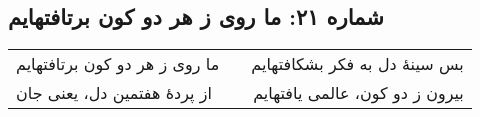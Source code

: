 \begin{center}
\section*{شماره ۲۱: ما روی ز هر دو کون برتافتهایم}
\label{sec:021}
\begin{longtable}{l p{0.5cm} r}
ما روی ز هر دو کون برتافتهایم
&&
بس سینهٔ دل به فکر بشکافتهایم
\\
از پردهٔ هفتمین دل، یعنی جان
&&
بیرون ز دو کون، عالمی یافتهایم
\\
\end{longtable}
\end{center}
